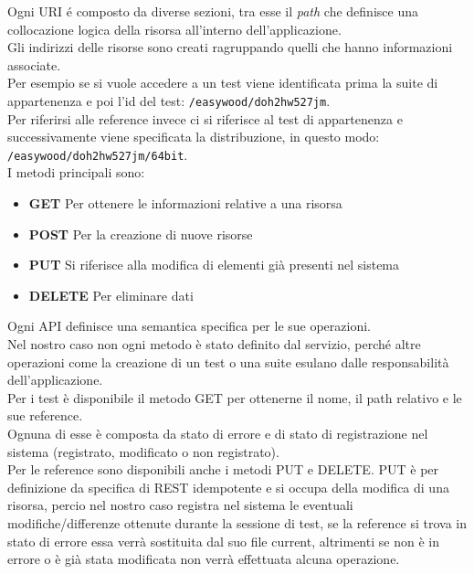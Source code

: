         Ogni URI \'e composto da diverse sezioni, tra esse il \textit{path} che definisce una collocazione logica della risorsa all'interno dell'applicazione.\\
        Gli indirizzi delle risorse sono creati ragruppando quelli che hanno informazioni associate.\\
        Per esempio se si vuole accedere a un test viene identificata prima la suite di appartenenza e poi l'id del test: \verb|/easywood/doh2hw527jm|.\\
        Per riferirsi alle reference invece ci si riferisce al test di appartenenza e successivamente viene specificata la distribuzione, in questo modo: \verb|/easywood/doh2hw527jm/64bit|.\\
        
        I metodi principali sono:
        
        \begin{itemize}
            \item \textbf{GET} Per ottenere le informazioni relative a una risorsa
            \item \textbf{POST} Per la creazione di nuove risorse
            \item \textbf{PUT} Si riferisce alla modifica di elementi già presenti nel sistema
            \item \textbf{DELETE} Per eliminare dati
        \end{itemize}
        
        Ogni API definisce una semantica specifica per le sue operazioni.\\
        Nel nostro caso non ogni metodo è stato definito dal servizio, perché altre operazioni come la creazione di un test o una suite esulano dalle responsabilità dell'applicazione.\\
        
        Per i test è disponibile il metodo GET per ottenerne il nome, il path relativo e le sue reference.\\
        Ognuna di esse è composta da stato di errore e di stato di registrazione nel sistema (registrato, modificato o non registrato).\\
        Per le reference sono disponibili anche i metodi PUT e DELETE. PUT è per definizione da specifica di REST idempotente e si occupa della modifica di una risorsa, percio nel nostro caso registra nel sistema le eventuali modifiche/differenze ottenute durante la sessione di test, se la reference si trova in stato di errore essa verrà sostituita dal suo file current, altrimenti se non è in errore o è già stata modificata non verrà effettuata alcuna operazione.\\
        

